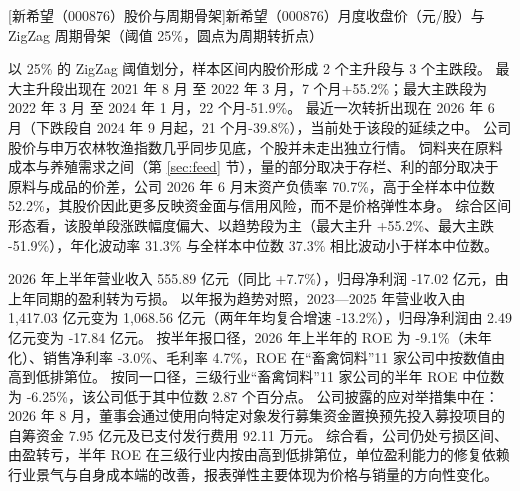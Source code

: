\begin{center}
\begin{minipage}{\textwidth}\centering
{}

[新希望（000876）股价与周期骨架]{新希望（000876）月度收盘价（元/股）与 ZigZag 周期骨架（阈值 25\%，圆点为周期转折点）}
\end{minipage}
\end{center}

 以 25\% 的 ZigZag 阈值划分，样本区间内股价形成 2 个主升段与 3 个主跌段。 最大主升段出现在 2021 年 8 月 至 2022 年 3 月，7 个月+55.2\%；最大主跌段为 2022 年 3 月 至 2024 年 1 月，22 个月-51.9\%。 最近一次转折出现在 2026 年 6 月（下跌段自 2024 年 9 月起，21 个月-39.8\%），当前处于该段的延续之中。 公司股价与申万农林牧渔指数几乎同步见底，个股并未走出独立行情。 饲料夹在原料成本与养殖需求之间（第 \ref{sec:feed} 节），量的部分取决于存栏、利的部分取决于原料与成品的价差，公司 2026 年 6 月末资产负债率 70.7\%，高于全样本中位数 52.2\%，其股价因此更多反映资金面与信用风险，而不是价格弹性本身。 综合区间形态看，该股单段涨跌幅度偏大、以趋势段为主（最大主升 +55.2\%、最大主跌 -51.9\%），年化波动率 31.3\% 与全样本中位数 37.3\% 相比波动小于样本中位数。

 2026 年上半年营业收入 555.89 亿元（同比 +7.7\%），归母净利润 -17.02 亿元，由上年同期的盈利转为亏损。 以年报为趋势对照，2023---2025 年营业收入由 1,417.03 亿元变为 1,068.56 亿元（两年年均复合增速 -13.2\%），归母净利润由 2.49 亿元变为 -17.84 亿元。 按半年报口径，2026 年上半年的 ROE 为 -9.1\%（未年化）、销售净利率 -3.0\%、毛利率 4.7\%，ROE 在“畜禽饲料”11 家公司中按数值由高到低排第位。 按同一口径，三级行业“畜禽饲料”11 家公司的半年 ROE 中位数为 -6.25\%，该公司低于其中位数 2.87 个百分点。 公司披露的应对举措集中在：2026 年 8 月，董事会通过使用向特定对象发行募集资金置换预先投入募投项目的自筹资金 7.95 亿元及已支付发行费用 92.11 万元。 综合看，公司仍处亏损区间、由盈转亏，半年 ROE 在三级行业内按由高到低排第位，单位盈利能力的修复依赖行业景气与自身成本端的改善，报表弹性主要体现为价格与销量的方向性变化。

